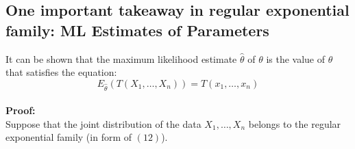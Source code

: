 \documentclass[12pt ]{article}
\begin{document}

\subsection{One important takeaway in regular exponential family: ML Estimates of Parameters}
It can be shown that the maximum likelihood estimate $\hat{\theta}$ of $\theta$ is the value of $\theta$ that satisfies the equation:
\begin{equation}
E_{\hat{\theta}}(T(X_{1}, \ldots, X_{n})) = T(x_{1}, \ldots, x_{n})
\end{equation} \\

\textbf{Proof:} \\
Suppose that the joint distribution of the data $X_{1}, \ldots, X_{n}$ belongs to the regular exponential family (in form of $(12)$). \\
\end{document}
